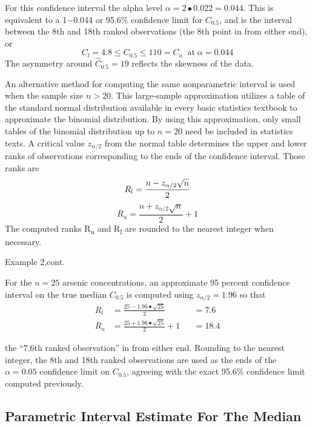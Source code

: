 \documentclass[]{book}
\begin{document}
For this confidence interval the alpha level \(\alpha = 2 \bullet 0.022 = 0.044\). This is equivalent to a 1−0.044 or 95.6\% confidence limit for \(C_{0.5}\), and is the interval between the 8th and 18th ranked observations (the 8th point in from either end), or \[C_{l} = 4.8 \leq C_{0.5} \leq 110 = C_{u} \; \; \text{at} \; \alpha = 0.044\] The asymmetry around \(\hat{C}_{0.5} = 19\) reflects the skewness of the data.

An alternative method for computing the same nonparametric interval is used when the sample size \(n > 20\). This large-sample approximation utilizes a table of the standard normal distribution available in every basic statistics textbook to approximate the binomial distribution. By using this approximation, only small tables of the binomial distribution up to \(n = 20\) need be included in statistics texts. A critical value \(z_{\alpha / 2}\) from the normal table determines the upper and lower ranks of observations corresponding to the ends of the confidence interval. Those ranks are
\begin{equation}
R_{l} = \frac{n - z_{\alpha / 2} \sqrt{n}}{2} \\
\label{eq:3-4}
\end{equation}
\begin{equation}
R_{u} = \frac{n + z_{\alpha / 2} \sqrt{n}}{2} + 1
\label{eq:3-5}
\end{equation}
The computed ranks R\textsubscript{u} and R\textsubscript{l} are rounded to the nearest integer when necessary.

Example 2,cont.

For the \(n = 25\) arsenic concentrations, an approximate 95 percent confidence interval on the true median \(C_{0.5}\) is computed using \(z_{\alpha / 2} = 1.96\) so that
\begin{equation}
\begin{aligned}
R_{l} &= \frac{25 - 1.96 \bullet \sqrt{25}}{2} &&= 7.6\\ 
R_{u} &= \frac{25 + 1.96 \bullet \sqrt{25}}{2} + 1 &&= 18.4
\end{aligned}
\end{equation}

the ``7.6th ranked observation'' in from either end. Rounding to the nearest integer, the 8th and 18th ranked observations are used as the ends of the \(\alpha = 0.05\) confidence limit on \(C_{0.5}\), agreeing with the exact 95.6\% confidence limit computed previously.

\hypertarget{ch3-3-2}{%
\subsection{Parametric Interval Estimate For The Median}\label{ch3-3-2}}
\end{document}
